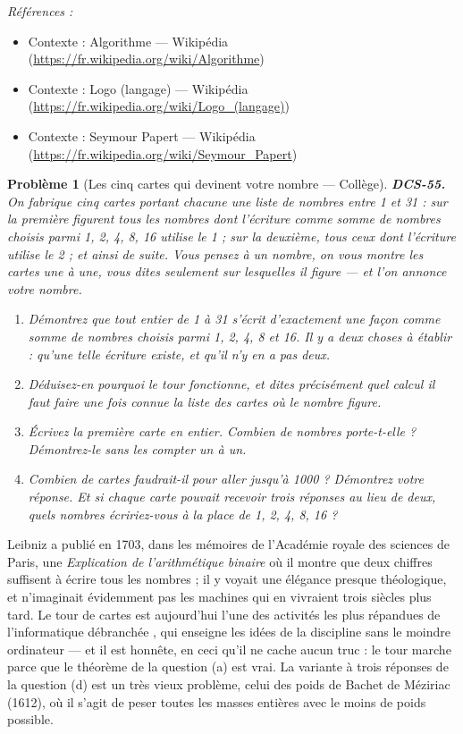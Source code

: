\documentclass[11pt]{article}
\newtheorem{problem}{Problème}
\newenvironment{refs}{\par\small\noindent\emph{Références :}\begin{itemize}\setlength\itemsep{0pt}}{\end{itemize}\normalsize}
\begin{document}
\begin{refs}
\item Contexte : Algorithme --- Wikipédia (\url{https://fr.wikipedia.org/wiki/Algorithme})
\item Contexte : Logo (langage) --- Wikipédia (\url{https://fr.wikipedia.org/wiki/Logo_(langage)})
\item Contexte : Seymour Papert --- Wikipédia (\url{https://fr.wikipedia.org/wiki/Seymour_Papert})
\end{refs}

\bigskip

\begin{problem}[{Les cinq cartes qui devinent votre nombre --- Collège}]
\textbf{DCS-55.} On fabrique cinq cartes portant chacune une liste de nombres entre 1
et 31 : sur la première figurent tous les nombres dont l'écriture comme somme de nombres
choisis parmi 1, 2, 4, 8, 16 utilise le 1 ; sur la deuxième, tous ceux dont l'écriture
utilise le 2 ; et ainsi de suite. Vous pensez à un nombre, on vous montre les cartes une à
une, vous dites seulement sur lesquelles il figure --- et l'on annonce votre nombre.
\begin{enumerate}
\item[(a)] Démontrez que tout entier de 1 à 31 s'écrit d'exactement une façon comme somme de
nombres choisis parmi 1, 2, 4, 8 et 16. Il y a deux choses à établir : qu'une telle écriture
existe, et qu'il n'y en a pas deux.
\item[(b)] Déduisez-en pourquoi le tour fonctionne, et dites précisément quel calcul il faut faire
une fois connue la liste des cartes où le nombre figure.
\item[(c)] Écrivez la première carte en entier. Combien de nombres porte-t-elle ? Démontrez-le sans
les compter un à un.
\item[(d)] Combien de cartes faudrait-il pour aller jusqu'à 1000 ? Démontrez votre réponse. Et si
chaque carte pouvait recevoir trois réponses au lieu de deux, quels nombres écririez-vous à
la place de 1, 2, 4, 8, 16 ?
\end{enumerate}

\end{problem}

\noindent Leibniz a publié en 1703, dans les mémoires de l'Académie royale des
sciences de Paris, une \textit{Explication de l'arithmétique binaire} où il montre que deux
chiffres suffisent à écrire tous les nombres ; il y voyait une élégance presque théologique,
et n'imaginait évidemment pas les machines qui en vivraient trois siècles plus tard. Le tour
de cartes est aujourd'hui l'une des activités les plus répandues de l'informatique
\og{} débranchée \fg{}, qui enseigne les idées de la discipline sans le moindre ordinateur --- et il
est honnête, en ceci qu'il ne cache aucun truc : le tour marche parce que le théorème de la
question (a) est vrai. La variante à trois réponses de la question (d) est un très vieux
problème, celui des poids de Bachet de Méziriac (1612), où il s'agit de peser toutes les
masses entières avec le moins de poids possible.
\end{document}
